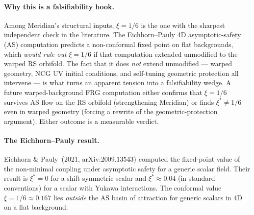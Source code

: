 \paragraph{Why this is a falsifiability hook.} Among Meridian's structural inputs, $\xi = 1/6$ is the one with the sharpest independent check in the literature. The Eichhorn--Pauly 4D asymptotic-safety (AS) computation predicts a non-conformal fixed point on flat backgrounds, which \emph{would rule out} $\xi = 1/6$ if that computation extended unmodified to the warped RS orbifold. The fact that it does \emph{not} extend unmodified --- warped geometry, NCG UV initial conditions, and self-tuning geometric protection all intervene --- is what turns an apparent tension into a falsifiability wedge. A future warped-background FRG computation either confirms that $\xi = 1/6$ survives AS flow on the RS orbifold (strengthening Meridian) or finds $\xi^* \not= 1/6$ even in warped geometry (forcing a rewrite of the geometric-protection argument). Either outcome is a measurable verdict.

\paragraph{The Eichhorn--Pauly result.} Eichhorn \& Pauly~(2021, arXiv:2009.13543) computed the fixed-point value of the non-minimal coupling under asymptotic safety for a generic scalar field. Their result is $\xi^* = 0$ for a shift-symmetric scalar and $\xi^* \approx 0.04$ (in standard conventions) for a scalar with Yukawa interactions. The conformal value $\xi = 1/6 \approx 0.167$ lies \emph{outside} the AS basin of attraction for generic scalars in 4D on a flat background.

